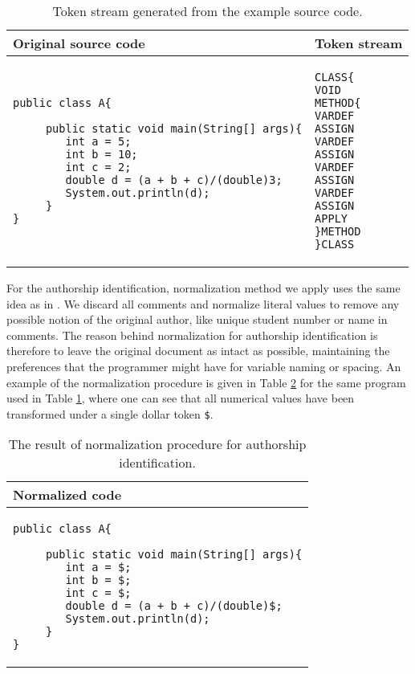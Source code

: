 \begin{table}[ht]
\centering
\caption{Token stream generated from the example source code.}
\label{tbl-token-stream}
\begin{tabular}{|l|l|} \hline
\bf Original source code & \bf Token stream \\ \hline
\begin{lstlisting}
public class A{

     public static void main(String[] args){
        int a = 5;
        int b = 10;
        int c = 2;
        double d = (a + b + c)/(double)3;
        System.out.println(d);
     }
}
\end{lstlisting}                     &

\begin{lstlisting}
CLASS{  
VOID    
METHOD{ 
VARDEF 
ASSIGN  
VARDEF 
ASSIGN  
VARDEF 
ASSIGN  
VARDEF 
ASSIGN  
APPLY   
}METHOD 
}CLASS
\end{lstlisting}
\\ \hline      
\end{tabular}
\end{table}

For the authorship identification, normalization method we apply uses the same idea as in \cite{AIRTSCAA2009, SCANG2007}. We discard all comments and normalize literal values to remove any possible notion of the original author, like unique student number or name in comments. The reason behind normalization for authorship identification is therefore to leave the original document as intact as possible, maintaining the preferences that the programmer might have for \eg variable naming or spacing. An example of the normalization procedure is given in Table \ref{tbl-ai-normalization} for the same program used in Table \ref{tbl-token-stream}, where one can see that all numerical values have been transformed under a single dollar token \texttt{\$}.

\begin{table}[ht]
\centering
\caption{The result of normalization procedure for authorship identification.}
\label{tbl-ai-normalization}
\begin{tabular}{|l|} \hline
\bf Normalized code \\ \hline
\begin{lstlisting}
public class A{

     public static void main(String[] args){
        int a = $;
        int b = $;
        int c = $;
        double d = (a + b + c)/(double)$; 
        System.out.println(d);
     }
}
\end{lstlisting} 

\\ \hline      
\end{tabular}
\end{table}

